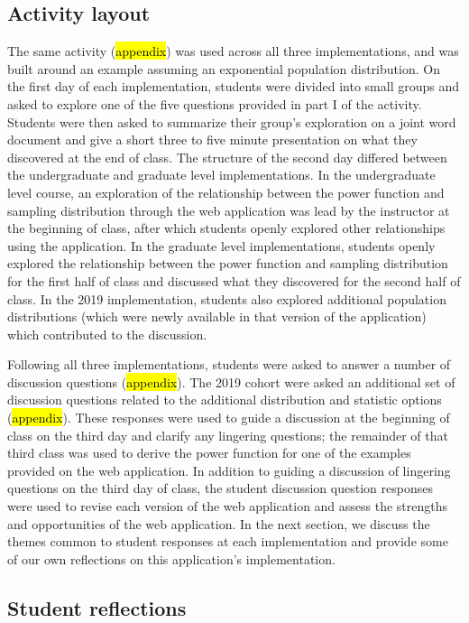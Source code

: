 \documentclass{TISE}
\begin{document}
\subsection{Activity layout}

The same activity (\hl{appendix}) was used across all three implementations, and was built around an example assuming an exponential population distribution. On the first day of each implementation, students were divided into small groups and asked to explore one of the five questions provided in part I of the activity. Students were then asked to summarize their group's exploration on a joint word document and give a short three to five minute presentation on what they discovered at the end of class. The structure of the second day differed between the undergraduate and graduate level implementations. In the undergraduate level course, an exploration of the relationship between the power function and sampling distribution through the web application was lead by the instructor at the beginning of class, after which students openly explored other relationships using the application. In the graduate level implementations, students openly explored the relationship between the power function and sampling distribution for the first half of class and discussed what they discovered for the second half of class. In the 2019 implementation, students also explored additional population distributions (which were newly available in that version of the application) which contributed to the discussion. 

Following all three implementations, students were asked to answer a number of discussion questions (\hl{appendix}). The 2019 cohort were asked an additional set of discussion questions related to the additional distribution and statistic options (\hl{appendix}). These responses were used to guide a discussion at the beginning of class on the third day and clarify any lingering questions; the remainder of that third class was used to derive the power function for one of the examples provided on the web application. In addition to guiding a discussion of lingering questions on the third day of class, the student discussion question responses were used to revise each version of the web application and assess the strengths and opportunities of the web application. In the next section, we discuss the themes common to student responses at each implementation and provide some of our own reflections on this application's implementation. 

\subsection{Student reflections}
\end{document}
